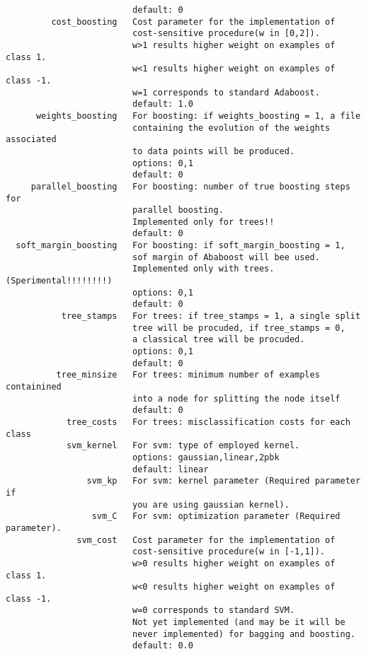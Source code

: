 \begin{verbatim}
                         default: 0
         cost_boosting   Cost parameter for the implementation of 
                         cost-sensitive procedure(w in [0,2]).
                         w>1 results higher weight on examples of class 1.
                         w<1 results higher weight on examples of class -1.
                         w=1 corresponds to standard Adaboost.
                         default: 1.0
      weights_boosting   For boosting: if weights_boosting = 1, a file 
                         containing the evolution of the weights associated 
                         to data points will be produced.
                         options: 0,1
                         default: 0
     parallel_boosting   For boosting: number of true boosting steps for 
                         parallel boosting.
                         Implemented only for trees!!
                         default: 0
  soft_margin_boosting   For boosting: if soft_margin_boosting = 1, 
                         sof margin of Ababoost will bee used. 
                         Implemented only with trees. (Sperimental!!!!!!!!)
                         options: 0,1
                         default: 0
           tree_stamps   For trees: if tree_stamps = 1, a single split 
                         tree will be procuded, if tree_stamps = 0, 
                         a classical tree will be procuded.
                         options: 0,1
                         default: 0
          tree_minsize   For trees: minimum number of examples containined
                         into a node for splitting the node itself
                         default: 0
            tree_costs   For trees: misclassification costs for each class
            svm_kernel   For svm: type of employed kernel.
                         options: gaussian,linear,2pbk
                         default: linear
                svm_kp   For svm: kernel parameter (Required parameter if 
                         you are using gaussian kernel).
                 svm_C   For svm: optimization parameter (Required parameter).
              svm_cost   Cost parameter for the implementation of 
                         cost-sensitive procedure(w in [-1,1]).
                         w>0 results higher weight on examples of class 1.
                         w<0 results higher weight on examples of class -1.
                         w=0 corresponds to standard SVM.
                         Not yet implemented (and may be it will be 
                         never implemented) for bagging and boosting.
                         default: 0.0

\end{verbatim}

